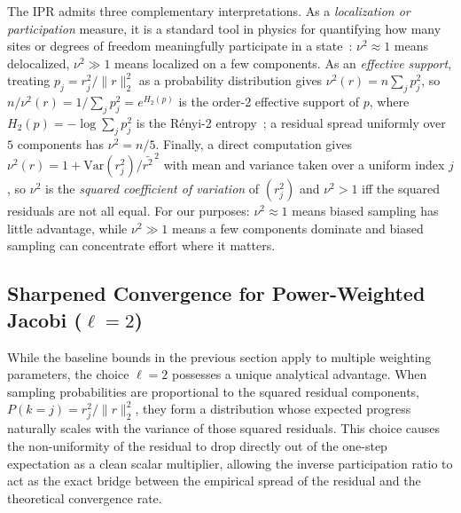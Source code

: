 \documentclass[pdflatex,sn-mathphys-num]{sn-jnl}%
\theoremstyle{thmstyleone}%
\theoremstyle{thmstyletwo}%
\theoremstyle{thmstylethree}%
\begin{document}
The IPR admits three complementary interpretations.
As a \emph{localization or participation} measure, it is a standard tool
in physics for quantifying how many sites or degrees of freedom meaningfully
participate in a state~\cite{evers2008anderson}: $\nu^2 \approx 1$ means
delocalized, $\nu^2 \gg 1$ means localized on a few components.
As an \emph{effective support}, treating $p_j = r_j^2/\|r\|_2^2$ as a
probability distribution gives $\nu^2(r) = n\sum_j p_j^2$, so
$n/\nu^2(r) = 1/\sum_j p_j^2 = e^{H_2(p)}$ is the order-2 effective
support of $p$, where $H_2(p) = -\log\sum_j p_j^2$ is the R\'enyi-2
entropy~\cite{renyi1961measures}; a residual spread uniformly over $5$
components has $\nu^2 = n/5$.
Finally, a direct computation gives $\nu^2(r) = 1 + \mathrm{Var}(r_j^2)/\bar{r^2}^{\,2}$
with mean and variance taken over a uniform index $j$, so $\nu^2$ is the
\emph{squared coefficient of variation} of $(r_j^2)$ and $\nu^2 > 1$ iff
the squared residuals are not all equal. For our purposes:
$\nu^2 \approx 1$ means biased sampling has little advantage, while
$\nu^2 \gg 1$ means a few components dominate and biased sampling can
concentrate effort where it matters. 


\subsection{Sharpened Convergence for Power-Weighted Jacobi ($\ell = 2$)}

While the baseline bounds in the previous section apply to multiple weighting parameters, the choice $\ell=2$ possesses a unique analytical advantage. When sampling probabilities are proportional to the squared residual components, $P(k=j) = r_j^2/\|r\|_2^2$, they form a distribution whose expected progress naturally scales with the variance of those squared residuals. This choice causes the non-uniformity of the residual to drop directly out of the one-step expectation as a clean scalar multiplier, allowing the inverse participation ratio to act as the exact bridge between the empirical spread of the residual and the theoretical convergence rate.
\end{document}
